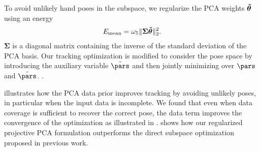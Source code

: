 To avoid unlikely hand poses in the subspace, we regularize the PCA weights $\boldsymbol{\tilde\theta}$ using an energy
% 
\begin{eqnarray}
E_{\text{mean}} = \omega_5 \|\boldsymbol{\Sigma} \boldsymbol{\tilde\theta} \|_2^2. 
\label{eq:pcareg}
\end{eqnarray}
% 
$\boldsymbol{\Sigma}$ is a diagonal matrix containing the inverse of the standard deviation of the PCA basis.
Our tracking optimization is modified to consider the pose space by introducing the auxiliary variable $\tilde\pars$ and then jointly minimizing over $\pars$ and $\tilde\pars$. .
% 

 illustrates how the PCA data prior improves tracking by avoiding unlikely poses, in particular when the input data is incomplete.
We found that even when data  coverage is sufficient to recover the correct pose, the data term improves the convergence of the optimization as illustrated in .
% 
 shows how our regularized projective PCA formulation outperforms the direct subspace optimization proposed in previous work.





